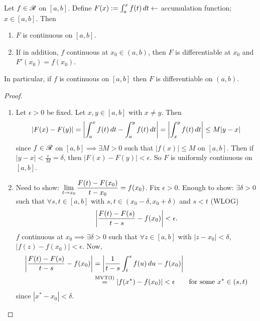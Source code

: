 \documentclass[]{article}
\begin{document}
\begin{theorem}
	\label{thm-6-20}
	Let $f\in\mathscr{R}$ on $[a,b]$. Define $F(x) := \int_a^x f(t)\,dt \leftarrow$ accumulation function; $x\in[a,b]$. Then
	\begin{enumerate}
		\item $F$ is continuous on $[a,b]$.
		\item If in addition, $f$ continuous at $x_0\in(a,b)$, then $F$ is differentiable at $x_0$ and $F'(x_0) = f(x_0)$.
	\end{enumerate}
\end{theorem}
\begin{note}
	In particular, if $f$ is continuous on $[a,b]$ then $F$ is differentiable on $(a,b)$.
\end{note}
\begin{proof}
	\begin{enumerate}
		\item Let $\epsilon>0$ be fixed. Let $x,y\in[a,b]$ with $x\neq y$. Then 
			\begin{align*}
				|F(x)-F(y)| = \left|\int_a^xf(t)\,dt - \int_a^yf(t)\,dt\right|
				= \left|\int_x^yf(t)\,dt\right|
				\leq M|y-x|
			\end{align*}
			since $f\in\mathscr{R}$ on $[a,b] \implies \exists M>0$ such that $|f(x)|\leq M$ on $[a,b]$.
			Then if $|y-x|<\frac\epsilon M = \delta$, then $|F(x)-F(y)|<\epsilon$.
			So $F$ is uniformly continuous on $[a,b]$.
		\item Need to show: $\displaystyle\lim_{t\rightarrow x_0} \frac{F(t)-F(x_0)}{t-x_0} = f(x_0)$.
			Fix $\epsilon>0$. Enough to show: $\exists\delta>0$ such that $\forall s,t\in [a,b]$ with $s,t\in(x_0-\delta,x_0+\delta)$ and $s<t$ (WLOG)
			$$ \left|\frac{F(t)-F(s)}{t-s}-f(x_0)\right|<\epsilon. $$
			$f$ continuous at $x_0 \implies \exists \delta>0$ such that $\forall z\in[a,b]$ with $|z-x_0|<\delta$, $|f(z)-f(x_0)|<\epsilon$.
			Now,
			\begin{align*}
				\left|\frac{F(t)-F(s)}{t-s}-f(x_0)\right| 
				&= \left|\frac1{t-s}\int_t^s f(u)\,du - f(x_0)\right| \\
				&\overset{\text{MVT(I)}}{=} \left|f(x^*)-f(x_0)\right| < \epsilon \qquad \text{for some }x^*\in(s,t)
			\end{align*}
			since $|x^*-x_0|<\delta$.
	\end{enumerate}
\end{proof}
\end{document}
